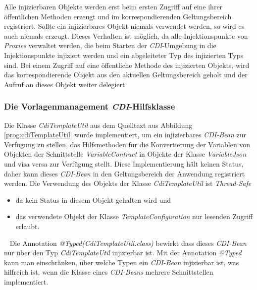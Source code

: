 \newline
\newline
Alle injizierbaren Objekte werden erst beim ersten Zugriff auf eine ihrer öffentlichen Methoden erzeugt und im korrespondierenden Geltungsbereich registriert. Sollte ein injizierbares Objekt niemals verwendet werden, so wird es auch niemals erzeugt. Dieses Verhalten ist möglich, da alle Injektionspunkte von \emph{Proxies} verwaltet werden, die beim Starten der \emph{CDI}-Umgebung in die Injektionspunkte injiziert werden und ein abgeleiteter Typ des injizierten Typs sind. Bei einem Zugriff auf eine öffentliche Methode des injizierten Objekts, wird das korrespondierende Objekt aus den aktuellen Geltungsbereich geholt und der Aufruf an dieses Objekt weiter delegiert.  

\subsubsection{Die Vorlagenmanagement \emph{CDI}-Hilfsklasse}
Die Klasse \emph{CdiTemplateUtil} aus dem Quelltext aus Abbildung \ref{prog:cdiTemplateUtil} wurde implementiert, um ein injizierbares \emph{CDI-Bean} zur Verfügung zu stellen, das Hilfsmethoden für die Konvertierung der Variablen von Objekten der Schnittstelle \emph{VariableContract} in Objekte der Klasse \emph{VariableJson} und visa versa zur Verfügung stellt. Diese Implementierung hält keinen Status, daher kann dieses \emph{CDI-Bean} in den Geltungsbereich der Anwendung registriert werden. Die Verwendung des Objekts der Klasse \emph{CdiTemplateUtil} ist \emph{Thread-Safe}
\begin{itemize}
	\item da kein Status in diesem Objekt gehalten wird und
	\item das verwendete Objekt der Klasse \emph{TemplateConfiguration} nur lesenden Zugriff erlaubt.
\end{itemize}
\ \newline
Die Annotation \emph{@Typed(CdiTemplateUtil.class)} bewirkt dass dieses \emph{CDI-Bean} nur über den Typ \emph{CdiTemplateUtil} injizierbar ist. Mit der Annotation \emph{@Typed} kann man einschränken, über welche Typen ein \emph{CDI-Bean} injizierbar ist, was hilfreich ist, wenn die Klasse eines \emph{CDI-Beans} mehrere Schnittstellen implementiert.


